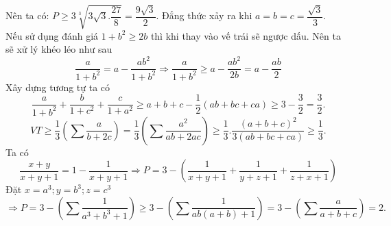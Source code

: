 Nên ta có: $P\ge 3\sqrt[3]{3\sqrt{3}.\dfrac{27}{8}}=\dfrac{9\sqrt{3}}{2}$. Đẳng thức xảy ra khi $a=b=c=\dfrac{\sqrt{3}}{3}$.\\
\hda  Nếu sử dụng đánh giá $1+{{b}^{2}}\ge 2b$ thì khi thay vào vế trái sẽ ngược dấu. Nên ta sẽ xử lý khéo léo như sau
\[\frac{a}{1+{{b}^{2}}}=a-\frac{a{{b}^{2}}}{1+{{b}^{2}}}\Rightarrow \frac{a}{1+{{b}^{2}}}\ge a-\frac{a{{b}^{2}}}{2b}=a-\frac{ab}{2}\]
Xây dựng tương tự ta có \[\frac{a}{1+{{b}^{2}}}+\frac{b}{1+{{c}^{2}}}+\frac{c}{1+{{a}^{2}}}\ge a+b+c-\frac{1}{2}\left( ab+bc+ca \right)\ge 3-\frac{3}{2}=\frac{3}{2}.\]
\hda  \[VT\ge \frac{1}{3}\left( \sum{\frac{a}{b+2c}} \right)=\frac{1}{3}\left( \sum{\frac{{{a}^{2}}}{ab+2ac}} \right)\ge \frac{1}{3}.\frac{{{\left( a+b+c \right)}^{2}}}{3\left( ab+bc+ca \right)}\ge \frac{1}{3}.\]
\hda  Ta có \[\frac{x+y}{x+y+1}=1-\frac{1}{x+y+1}\Rightarrow P=3-\left( \frac{1}{x+y+1}+\frac{1}{y+z+1}+\frac{1}{z+x+1} \right)\]
Đặt $x={{a}^{3}};y={{b}^{3}};z={{c}^{3}}$
\[\Rightarrow P=3-\left( \sum{\frac{1}{{{a}^{3}}+{{b}^{3}}+1}} \right)\ge 3-\left( \sum{\frac{1}{ab\left( a+b \right)+1}} \right)=3-\left( \sum{\frac{a}{a+b+c}} \right)=2.\]
